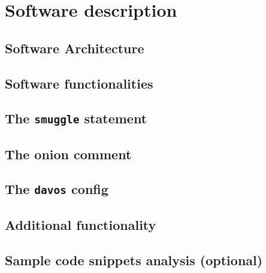 \documentclass[preprint,12pt, a4paper]{elsarticle}
\begin{document}



\section{Software description}


\subsection{Software Architecture}


\subsection{Software functionalities}\label{sec:functionalities}

\subsection{The \texttt{smuggle} statement}

\subsection{The onion comment}

\subsection{The \texttt{davos} config}

\subsection{Additional functionality}



\subsection{Sample code snippets analysis (optional)}
\end{document}
